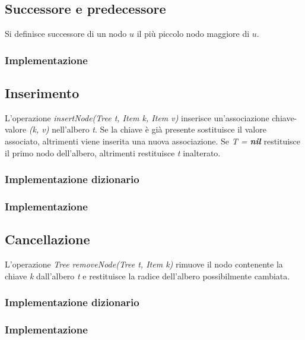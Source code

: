 \subsection{Successore e predecessore}
Si definisce successore di un nodo $u$ il pi\`u piccolo nodo maggiore di $u$. 
\subsubsection{Implementazione}
\begin{multicols}{2}

\columnbreak

\end{multicols}
\subsection{Inserimento}
L'operazione \emph{insertNode(Tree t, Item k, Item v)} inserisce un'associazione chiave-valore \emph{(k, v)} nell'albero \emph{t}. Se la chiave \`e gi\`a 
presente sostituisce il valore associato, altrimenti viene inserita una nuova associazione. Se \emph{T = \textbf{nil}} restituisce il primo nodo
dell'albero, altrimenti restituisce \emph{t} inalterato.
\subsubsection{Implementazione dizionario}

\subsubsection{Implementazione}


\subsection{Cancellazione}
L'operazione \emph{Tree removeNode(Tree t, Item k)} rimuove il nodo contenente la chiave \emph{k} dall'albero \emph{t} e restituisce la radice dell'albero
possibilmente cambiata.
\subsubsection{Implementazione dizionario}

\subsubsection{Implementazione}

